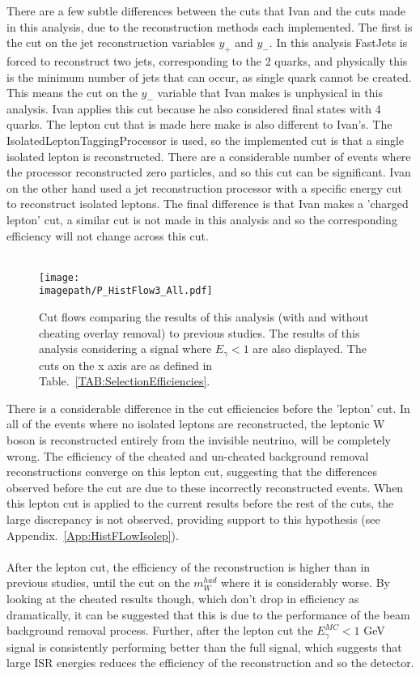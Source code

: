 There are a few subtle differences between the cuts that Ivan and the cuts made in this analysis, due to the reconstruction methods each implemented. The first is the cut on the jet reconstruction variables ${y}_{+}$ and ${y}_{-}$. In this analysis FastJets \cite{Cacciari:2011ma} is forced to reconstruct two jets, corresponding to the 2 quarks, and physically this is the minimum number of jets that can occur, as single quark cannot be created. This means the cut on the ${y}_{-}$ variable that Ivan makes is unphysical in this analysis. Ivan applies this cut because he also considered final states with 4 quarks. The lepton cut that is made here make is also different to Ivan’s. The IsolatedLeptonTaggingProcessor is used, so the implemented cut is that a single isolated lepton is reconstructed. There are a considerable number of events where the processor reconstructed zero particles, and so this cut can be significant. Ivan on the other hand used a jet reconstruction processor with a specific energy cut to reconstruct isolated leptons. The final difference is that Ivan makes a 'charged lepton' cut, a similar cut is not made in this analysis and so the corresponding efficiency will not change across this cut.
\\\\
\begin{figure}[!]
    \centering
    \texttt{[image: \\imagepath/P\_HistFlow3\_All.pdf]}
    \caption{
    Cut flows comparing the results of this analysis (with and without cheating overlay removal) to previous studies.  The results of this analysis considering a signal where ${E}_{\gamma} < 1$ are also displayed. The cuts on the x axis are as defined in Table.~\ref{TAB:SelectionEfficiencies}.
    }
    \label{FIG:Flow}
\end{figure}
There is a considerable difference in the cut efficiencies before the 'lepton' cut. In all of the events where no isolated leptons are reconstructed, the leptonic W boson is reconstructed entirely from the invisible neutrino, will be completely wrong. The efficiency of the cheated and un-cheated background removal reconstructions converge on this lepton cut, suggesting that the differences observed before the cut are due to these incorrectly reconstructed events. When this lepton cut is applied to the current results before the rest of the cuts, the large discrepancy is not observed, providing support to this hypothesis (see Appendix.~\ref{App:HistFLowIsolep}).
\\\\
After the lepton cut, the efficiency of the reconstruction is higher than in previous studies, until the cut on the ${m}_{W}^{had}$ where it is considerably worse. By looking at the cheated results though, which don't drop in efficiency as dramatically, it can be suggested that this is due to the performance of the beam background removal process. Further, after the lepton cut the ${E}_{\gamma}^{MC} < 1$ GeV signal is consistently performing better than the full signal, which suggests that large ISR energies reduces the efficiency of the reconstruction and so the detector.


